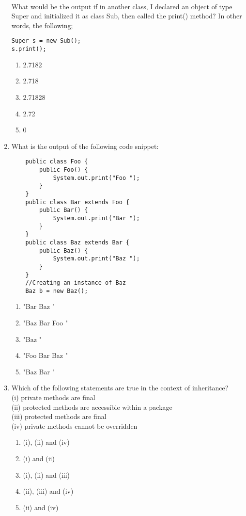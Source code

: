 \documentclass[S17-Final.tex]{subfiles}
\begin{document}
\begin{enumerate}
\begin{lstlisting}
    
\end{lstlisting}
What would be the output if in another class, I declared an object of type Super and initialized it as class Sub, then called the print() method? In other words, the following;
\begin{lstlisting}
Super s = new Sub();
s.print();
\end{lstlisting}
\begin{enumerate}
\item  2.7182
\item  2.718
\item  2.71828
\item  2.72
\item  0
\end{enumerate}
\clearpage
\item What is the output of the following code snippet:
\begin{lstlisting}
    public class Foo {
        public Foo() {
            System.out.print("Foo ");
        }
    }
    public class Bar extends Foo {
        public Bar() {
            System.out.print("Bar ");
        }
    } 
    public class Baz extends Bar {
        public Baz() {
            System.out.print("Baz ");
        }
    } 
    //Creating an instance of Baz
    Baz b = new Baz();

\end{lstlisting}
	
\begin{enumerate}
\item  "Bar Baz "
\item  "Baz Bar Foo "
\item  "Baz "
\item  "Foo Bar Baz "
\item  "Baz Bar "
\end{enumerate}

\item Which of the following statements are true in the context of inheritance?\\

    (i) private methods are final\\
	(ii) protected methods are accessible within a package\\
	(iii) protected methods are final\\
	(iv) private methods cannot be overridden\\
	
\begin{enumerate}
\item  (i), (ii) and (iv)
\item  (i) and (ii)
\item  (i), (ii) and (iii)
\item  (ii), (iii) and (iv)
\item  (ii) and (iv)
\end{enumerate}


\end{enumerate}
\end{document}
